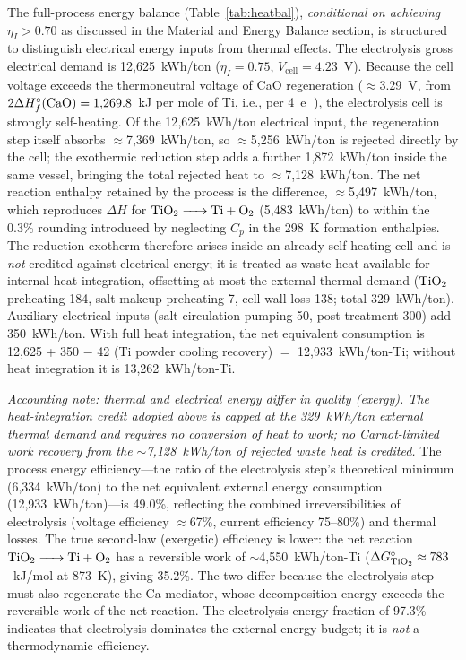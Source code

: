 \documentclass[pdflatex,sn-basic,Numbered]{sn-jnl}
\begin{document}
The full-process energy balance (Table~\ref{tab:heatbal}), \emph{conditional on achieving $\eta_I > 0.70$} as discussed in the Material and Energy Balance section, is structured to distinguish electrical energy inputs from thermal effects. The electrolysis gross electrical demand is 12{,}625~kWh/ton ($\eta_I=0.75$, $V_{\mathrm{cell}}=4.23$~V). Because the cell voltage exceeds the thermoneutral voltage of CaO regeneration ($\approx$3.29~V, from $2\Delta H^{\circ}_{f}(\ce{CaO}) = 1{,}269.8$~kJ per mole of Ti, i.e., per 4~e$^-$), the electrolysis cell is strongly self-heating. Of the 12{,}625~kWh/ton electrical input, the regeneration step itself absorbs $\approx$7{,}369~kWh/ton, so $\approx$5{,}256~kWh/ton is rejected directly by the cell; the exothermic reduction step adds a further 1{,}872~kWh/ton inside the same vessel, bringing the total rejected heat to $\approx$7{,}128~kWh/ton. The net reaction enthalpy retained by the process is the difference, $\approx$5{,}497~kWh/ton, which reproduces $\Delta H$ for $\ce{TiO2 -> Ti + O2}$ (5{,}483~kWh/ton) to within the 0.3\% rounding introduced by neglecting $C_p$ in the 298~K formation enthalpies. The reduction exotherm therefore arises inside an already self-heating cell and is \emph{not} credited against electrical energy; it is treated as waste heat available for internal heat integration, offsetting at most the external thermal demand ($\ce{TiO2}$ preheating 184, salt makeup preheating 7, cell wall loss 138; total 329~kWh/ton). Auxiliary electrical inputs (salt circulation pumping 50, post-treatment 300) add 350~kWh/ton. With full heat integration, the net equivalent consumption is 12{,}625 + 350 $-$ 42 (Ti powder cooling recovery) $=$ 12{,}933~kWh/ton-Ti; without heat integration it is 13{,}262~kWh/ton-Ti.

\emph{Accounting note: thermal and electrical energy differ in quality (exergy). The heat-integration credit adopted above is capped at the 329~kWh/ton external thermal demand and requires no conversion of heat to work; no Carnot-limited work recovery from the $\sim$7{,}128~kWh/ton of rejected waste heat is credited.} The process energy efficiency---the ratio of the electrolysis step's theoretical minimum (6{,}334~kWh/ton) to the net equivalent external energy consumption (12{,}933~kWh/ton)---is 49.0\%, reflecting the combined irreversibilities of electrolysis (voltage efficiency $\approx$67\%, current efficiency 75--80\%) and thermal losses. The true second-law (exergetic) efficiency is lower: the net reaction $\ce{TiO2 -> Ti + O2}$ has a reversible work of $\sim$4{,}550~kWh/ton-Ti ($\Delta G^{\circ}_{\ce{TiO2}} \approx 783$~kJ/mol at 873~K), giving 35.2\%. The two differ because the electrolysis step must also regenerate the Ca mediator, whose decomposition energy exceeds the reversible work of the net reaction. The electrolysis energy fraction of 97.3\% indicates that electrolysis dominates the external energy budget; it is \emph{not} a thermodynamic efficiency.
\end{document}
